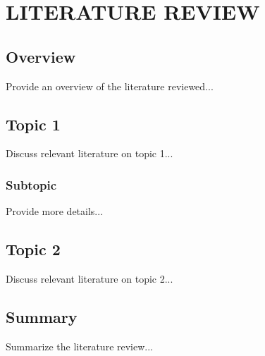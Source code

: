 
\chapter{LITERATURE REVIEW}

\ifpdf
    \graphicspath{{2/figures/PNG}{2/figures/PDF}{2/figures}}
\else
    \graphicspath{{2/figures/EPS}{2/figures}}
\fi

\section{Overview}
Provide an overview of the literature reviewed...

\section{Topic 1}
Discuss relevant literature on topic 1...

\subsection{Subtopic}
Provide more details...

\section{Topic 2}
Discuss relevant literature on topic 2...

\section{Summary}
Summarize the literature review...
